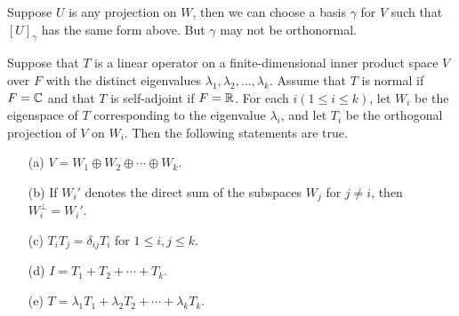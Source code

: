 Suppose \( U  \) is any projection on \( W  \), then we can choose a basis \( \gamma \) for \( V  \) such that \( [U]_{\gamma} \) has the same form above. But \( \gamma \) may not be orthonormal.

\begin{theorem}
    Suppose that \( T  \) is a linear operator on a finite-dimensional inner product space \( V  \) over \( F  \) with the distinct eigenvalues \( {\lambda}_{1}, {\lambda}_{2}, \dots, {\lambda}_{k} \). Assume that \( T  \) is normal if \( F = \mathbb{C}  \) and that \( T  \) is self-adjoint if \( F = \mathbb{R}  \). For each \( i (1 \leq i \leq k) \), let \( {W}_{i} \) be the eigenspace of \( T  \) corresponding to the eigenvalue \( {\lambda}_{i} \), and let \( {T}_{i} \) be the orthogonal projection of \( V  \) on \( {W}_{i} \). Then the following statements are true.
    \begin{enumerate}
        \item[(a)] \( V = {W}_{1} \oplus {W}_{2} \oplus \cdots \oplus {W}_{k} \).
        \item[(b)] If \( {W}_{i}' \) denotes the direct sum of the subspaces \( {W}_{j} \) for \( j \neq i  \), then \( {W}_{i}^{\perp} = {W}_{i}' \). 
        \item[(c)] \( {T}_{i} {T}_{j} = {\delta}_{ij} {T}_{i} \) for \( 1 \leq i, j \leq k  \).
        \item[(d)] \( I = {T}_{1} + {T}_{2} + \cdots + {T}_{k} \).
        \item[(e)] \( T = {\lambda}_{1} {T}_{1} + {\lambda}_{2} {T}_{2} + \cdots + {\lambda}_{k} {T}_{k } \).
    \end{enumerate}
\end{theorem} 

